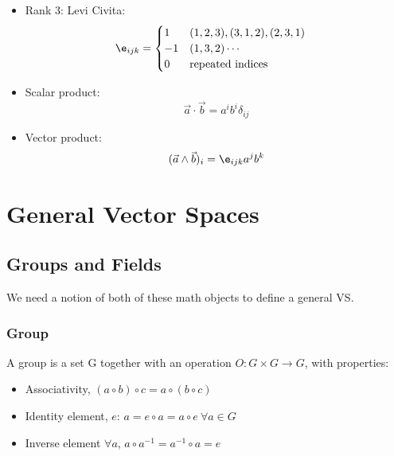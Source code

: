 \documentclass[cplx.tex]{subfiles}
\begin{document}
\begin{itemize}
    \item Rank 3: Levi Civita:
        \begin{align}
            \e_{ijk} &= \begin{cases} 1 & (1,2,3),(3,1,2),(2,3,1) \\ -1 & (1,3,2)\cdots \\ 0 & \text{repeated indices} \end{cases}
        \end{align}
    \item Scalar product:
        \begin{equation}
            \vec{a}\cdot\vec{b} = a^ib^i\delta_{ij} 
        \end{equation}
    \item Vector product:
    \begin{equation}
        (\vec{a}\land \vec{b})_i = \e_{ijk}a^jb^k
    \end{equation}
\end{itemize}

\chapter{General Vector Spaces}
\section{Groups and Fields}
We need a notion of both of these math objects to define a general VS. 

\subsection{Group}
A group is a set G together with an operation $O:G\times G\to G$, with properties:
\begin{itemize}
    \item Associativity, $(a\circ b)\circ c = a\circ(b\circ c)$
    \item Identity element, $e$: $a = e\circ a = a\circ e~\forall a \in G$
    \item Inverse element $\forall a$, $a \circ a^{-1} = a^{-1}\circ a = e$
    \end{itemize}
\end{document}
